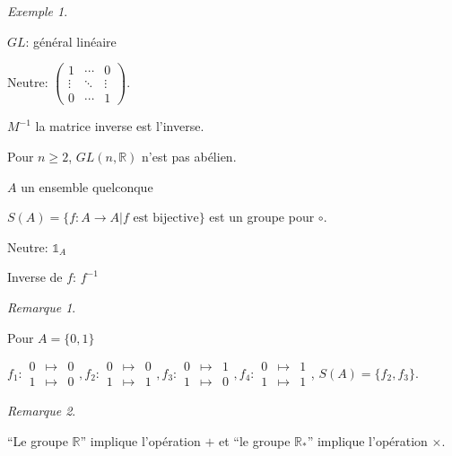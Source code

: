 \documentclass{report}
\newcommand*{\gte}{\geqslant}
\newcommand*{\reels}{\mathbb{R}}
\newcommand*{\identite}{\mathds{1}}
\theoremstyle{definition}
\theoremstyle{remark}
\newtheorem*{exem}{Exemple}
\newtheorem*{rema}{Remarque}
\begin{document}
\begin{exem}
\begin{nlist}[resume]
			$GL$: g\'en\'eral lin\'eaire

			Neutre: $\left( \begin{array}{ccc}
				1&\dotsb&0\\
				\vdots&\ddots&\vdots\\
				0&\dotsb&1
			\end{array} \right)$.

			$M^{-1}$ la matrice inverse est l'inverse.

			Pour $n \gte 2$, $GL(n,\reels)$  n'est pas ab\'elien.
			\item $A$ un ensemble quelconque

			$S(A)=\{f:A \to A|f \text{ est bijective}\}$ est un groupe pour $\circ$.

			Neutre: $\identite_A$

			Inverse de $f$: $f^{-1}$
		\end{nlist}
	\end{exem}
	\begin{rema}
		~

		Pour $A=\{0,1\}$

		$f_1:\begin{array}{rcl}
			0&\mapsto&0\\
			1&\mapsto&0
		\end{array},f_2:\begin{array}{rcl}
			0&\mapsto&0\\
			1&\mapsto&1
		\end{array},f_3:\begin{array}{rcl}
			0&\mapsto&1\\
			1&\mapsto&0
		\end{array},f_4:\begin{array}{rcl}
			0&\mapsto&1\\
			1&\mapsto&1
		\end{array}$, $S(A)=\{f_2,f_3\}$.
	\end{rema}

	\begin{rema}
		~

		``Le groupe $\reels$'' implique l'op\'eration $+$ et ``le groupe $\reels_*$'' implique l'op\'eration $\times$.
	\end{rema}
\end{document}
